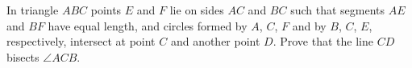 In triangle $ABC$ points $E$ and $F$ lie on sides $AC$ and $BC$ such that segments $AE$ and $BF$ have equal length, and circles formed by $A$, $C$, $F$ and by $B$, $C$, $E$, respectively, intersect at point $C$ and another point $D$. Prove that the line $CD$ bisects $\angle ACB$.
